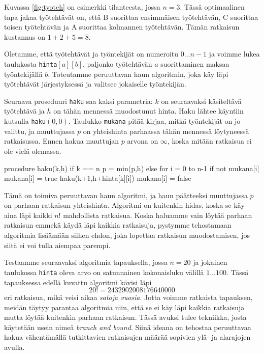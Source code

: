 Kuvassa \ref{fig:tyoteh} on esimerkki tilanteesta, jossa $n=3$.
Tässä optimaalinen tapa jakaa työtehtävät on,
että B suorittaa ensimmäisen työtehtävän,
C suorittaa toisen työtehtävän ja
A suorittaa kolmannen työtehtävän.
Tämän ratkaisun kustannus on $1+2+5=8$.

Oletamme, että työtehtävät ja työntekijät on numeroitu
$0 \dots n-1$ ja voimme lukea taulukosta \texttt{hinta}$[a][b]$,
paljonko työtehtävän $a$ suorittaminen maksaa
työntekijällä $b$.
Toteutamme peruuttavan haun algoritmin,
joka käy läpi työtehtävät järjestyksessä
ja valitsee jokaiselle työntekijän.

Seuraava proseduuri \texttt{haku} saa kaksi parametria:
$k$ on seuraavaksi käsitel\-tävä työtehtävä ja
$h$ on tähän mennessä muodostunut hinta.
Haku lähtee käyntiin kutsulla \texttt{haku}$(0,0)$.
Taulukko \texttt{mukana} pitää kirjaa,
mitkä työntekijät on jo valittu,
ja muuttujassa $p$ on yhteishinta
parhaassa tähän mennessä löytyneessä ratkaisussa.
Ennen hakua muuttujan $p$ arvona on $\infty$,
koska mi\-tään ratkaisua ei ole vielä olemassa.

\begin{code}
procedure haku(k,h)
    if k == n
        p = min(p,h)
    else
        for i = 0 to n-1
            if not mukana[i]
                mukana[i] = true
                haku(k+1,h+hinta[k][i])
                mukana[i] = false
\end{code}

Tämä on toimiva peruuttavan haun algoritmi,
ja haun päätteeksi muuttujassa $p$ on
parhaan ratkaisun yhteishinta.
Algoritmi on kuitenkin hidas, koska se käy aina läpi
kaikki $n!$ mahdollista ratkaisua.
Koska haluamme vain löytää parhaan ratkaisun emmekä
käydä läpi kaikkia ratkaisuja,
pystymme tehostamaan algoritmia lisäämään siihen ehdon,
joka lopettaa ratkaisun muodostamisen,
jos siitä ei voi tulla aiempaa parempi.

Testaamme seuraavaksi algoritmia tapauksella, jossa $n=20$ ja jokainen
taulukossa \texttt{hinta} oleva arvo on satunnainen
kokonaisluku välillä $1 \dots 100$.
Tässä tapauksessa edellä kuvattu algoritmi kävisi läpi 
\[20! = 2432902008176640000
\]
eri ratkaisua, mikä veisi aikaa \emph{satoja vuosia}.
Jotta voimme ratkaista tapauksen,
meidän täytyy parantaa algoritmia niin,
että se ei käy läpi kaikkia ratkaisuja
mutta löytää kuitenkin parhaan ratkaisun.
Tässä avuksi tulee tekniikka, josta käytetään usein nimeä
\emph{branch and bound}.
Siinä ideana on tehostaa peruuttavaa hakua
vähentämällä tutkittavien ratkaisujen määrää
sopivien ylä- ja alarajojen avulla.

